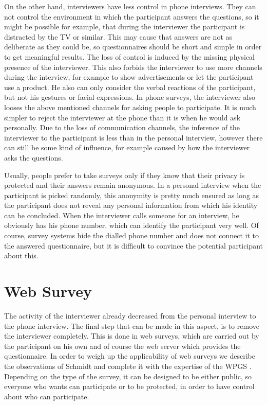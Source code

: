 \documentclass{report}
\begin{document}
On the other hand, interviewers have less control in phone interviews. They can not control the environment in which the participant answers the questions, so it might be possible for example, that during the interviewer the participant is distracted by the TV or similar. This may cause that answers are not as deliberate as they could be, so questionnaires should be short and simple in order to get meaningful results. The loss of control is induced by the missing physical presence of the interviewer. This also forbids the interviewer to use more channels during the interview, for example to show advertisements or let the participant use a product. He also can only consider the verbal reactions of the participant, but not his gestures or facial expressions. In phone surveys, the interviewer also looses the above mentioned channels for asking people to participate. It is much simpler to reject the interviewer at the phone than it is when he would ask personally. Due to the loss of communication channels, the inference of the interviewer to the participant is less than in the personal interview, however there can still be some kind of influence, for example caused by how the interviewer asks the questions.

Usually, people prefer to take surveys only if they know that their privacy is protected and their answers remain anonymous. In a personal interview when the participant is picked randomly, this anonymity is pretty much ensured as long as the participant does not reveal any personal information from which his identity can be concluded. When the interviewer calls someone for an interview, he obviously has his phone number, which can identify the participant very well. Of course, survey systems hide the dialled phone number and does not connect it to the answered questionnaire, but it is difficult to convince the potential participant about this.

\section{Web Survey}

The activity of the interviewer already decreased from the personal interview to the phone interview. The final step that can be made in this aspect, is to remove the interviewer completely. This is done in web surveys, which are carried out by the participant on his own and of course the web server which provides the questionnaire. In order to weigh up the applicability of web surveys we describe the observations of Schmidt \cite{intro} and complete it with the expertise of the WPGS \cite{cw}. Depending on the type of the survey, it can be designed to be either public, so everyone who wants can participate or to be protected, in order to have control about who can participate.
\end{document}
